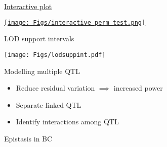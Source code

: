 \documentclass[12pt]{article}
\newcommand{\headsize}{\fontsize{35}{35} \selectfont}
\newcommand{\smallsize}{\fontsize{25}{30} \selectfont}
\begin{document}
\headsize \color{myyellow}
\hfill \begin{minipage}{5.75in}
\centering
\href{http://www.biostat.wisc.edu/~kbroman/D3/lod_random/}{Interactive plot}
\end{minipage}

\vspace{2cm}

\centerline{\href{http://www.biostat.wisc.edu/~kbroman/D3/lod_random}{\texttt{[image: Figs/interactive\_perm\_test.png]}}}

\vspace*{1cm}




\newpage

\headsize \color{myyellow}
\hfill \begin{minipage}{5.75in}
\centering
LOD support intervals
\end{minipage}

\vfill

\centerline{\texttt{[image: Figs/lodsuppint.pdf]}}






\newpage

\headsize \color{myyellow}
\hfill \begin{minipage}{5.75in}
\centering
Modelling multiple QTL
\end{minipage}

\vspace{2cm}

\color{mywhite} \smallsize

\hfill \begin{minipage}[t]{10in}
\begin{itemize}
\itemsep24pt
\item Reduce residual variation $\implies$ increased power

\item Separate linked QTL

\item Identify interactions among QTL

\end{itemize}
\end{minipage}


\newpage

\headsize \color{myyellow}
\hfill \begin{minipage}{5.75in}
\centering
Epistasis in BC
\end{minipage}

\vfill
\end{document}
